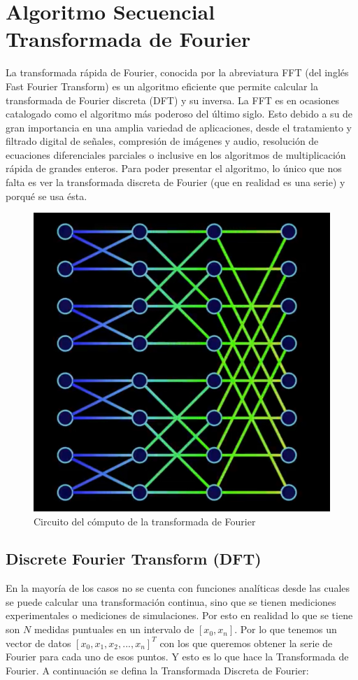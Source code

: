 \documentclass{report}
\begin{document}
\section*{Algoritmo Secuencial Transformada de Fourier}
\noindent La transformada rápida de Fourier, conocida por la abreviatura FFT (del inglés Fast Fourier Transform) es un algoritmo eficiente que permite calcular la transformada de Fourier discreta (DFT) y su inversa. La FFT es en ocasiones catalogado como el algoritmo más poderoso del último siglo. Esto debido a su de gran importancia en una amplia variedad de aplicaciones, desde el tratamiento y filtrado digital de señales, compresión de imágenes y audio, resolución de ecuaciones diferenciales parciales o inclusive en los algoritmos de multiplicación rápida de grandes enteros. Para poder presentar el algoritmo, lo único que nos falta es ver la transformada discreta de Fourier (que en realidad es una serie) y porqué se usa ésta.\medskip
\begin{figure}
\begin{center}
    \includegraphics[scale=0.24]{Images/FFT circuit.jpg}
    \caption{Circuito del cómputo de la transformada de Fourier}
\end{center}
\end{figure}

\subsection*{Discrete Fourier Transform (DFT)}
En la mayoría de los casos no se cuenta con funciones analíticas desde las cuales se puede calcular una transformación continua, sino que se tienen mediciones experimentales o mediciones de simulaciones. Por esto en realidad lo que se tiene son $N$ medidas puntuales en un intervalo de $[x_0, x_n]$. Por lo que tenemos un vector de datos $[x_0, x_1, x_2, ..., x_n]^T$ con los que queremos obtener la serie de Fourier para cada uno de esos puntos. Y esto es lo que hace la Transformada de Fourier. A continuación se defina la Transformada Discreta de Fourier:
\end{document}
